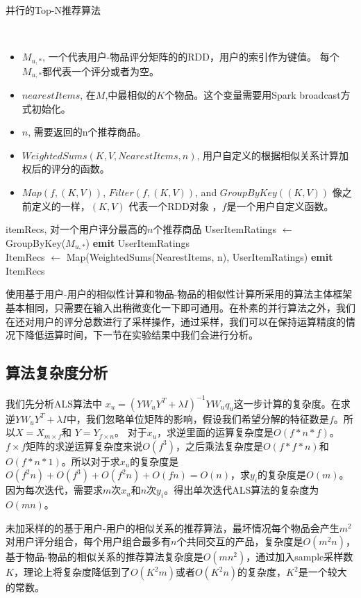     \begin{algorithm}
    \caption{并行的Top-N推荐算法}
    \begin{algorithmic}[1]
        \Require \\
        \begin{itemize}
               \item $M_{u, *}$, 一个代表用户-物品评分矩阵的的RDD，用户的索引作为键值。 每个$M_{u,*}$都代表一个评分或者为空。
            \item $nearestItems$, 在$M$,中最相似的$K$个物品。这个变量需要用Spark broadcast方式初始化。
            \item $n$, 需要返回的n个推荐商品。
            \item $WeightedSums(K, V, NearestItems, n)$, 用户自定义的根据相似关系计算加权后的评分的函数。
            \item $Map(f, (K, V))$, $Filter(f, (K, V))$, and $GroupByKey((K, V))$ 像之前定义的一样，$(K, V)$ 代表一个RDD对象 ，$f$是一个用户自定义函数。
        \end{itemize}
        \Ensure itemRecs, 对一个用户评分最高的$n$个推荐商品
            \State UserItemRatings $\leftarrow$ GroupByKey($M_{u, *}$)
            \State \textbf{emit} UserItemRatings
        \EndFunction
        \\
             \State ItemRecs $\leftarrow$ Map(WeightedSums(NearestItems, n), UserItemRatings)
            \State \textbf{emit} ItemRecs
        \EndFunction
    \end{algorithmic}
    \end{algorithm}

使用基于用户-用户的相似性计算和物品-物品的相似性计算所采用的算法主体框架基本相同，只需要在输入出稍微变化一下即可通用。在朴素的并行算法之外，我们在还对用户的评分总数进行了采样操作，通过采样，我们可以在保持运算精度的情况下降低运算时间，下一节在实验结果中我们会进行分析。

\subsection{算法复杂度分析}
我们先分析ALS算法中
$x_u = (Y W_u Y^T + \lambda I)^{-1} Y W_u q_u$这一步计算的复杂度。在求逆$Y W_u Y^T + \lambda I$中，我们忽略单位矩阵的影响，假设我们希望分解的特征数是$f$。所以$X = X_{m \times f}$和 $Y = Y_{f \times n}$。 对于$x_u$，求逆里面的运算复杂度是$O(f * n * f)$。 $f \times f$矩阵的求逆运算复杂度来说$O(f^3)$，之后乘法复杂度是$O(f*f*n)$和$O(f*n*1)$。所以对于求$x_u$的复杂度是$O(f^2n) + O(f^3) + O(f^2n) + O(fn) = O(n)$，求$y_i$的复杂度是$O(m)$。因为每次迭代，需要求$m$次$x_u$和$n$次$y_i$。得出单次迭代ALS算法的复杂度为$O(mn)$。

未加采样的的基于用户-用户的相似关系的推荐算法，最坏情况每个物品会产生$m^2$对用户评分组合，每个用户组合最多有$n$个共同交互的产品，复杂度是$O(m^2n)$，基于物品-物品的相似关系的推荐算法复杂度是$O(mn^2)$，通过加入sample采样数$K$，理论上将复杂度降低到了$O(K^2m)$或者$O(K^2n)$的复杂度，$K^2$是一个较大的常数。